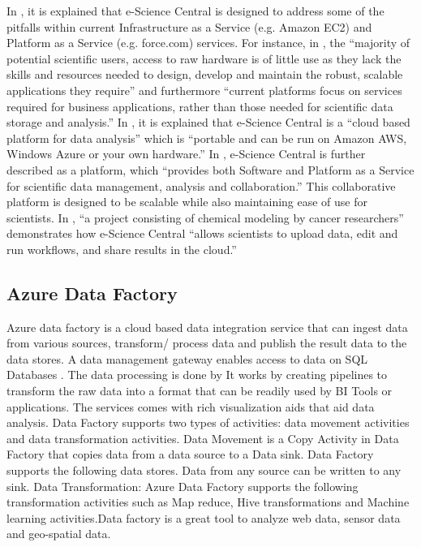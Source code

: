     In \cite{e-science-central-paper-2010}, it is explained that
    e-Science Central is designed to address some of the pitfalls
    within current Infrastructure as a Service (e.g.  Amazon EC2) and
    Platform as a Service (e.g. force.com) services. For instance, in
    \cite{e-science-central-paper-2010}, the ``majority of potential
    scientific users, access to raw hardware is of little use as they
    lack the skills and resources needed to design, develop and
    maintain the robust, scalable applications they require'' and
    furthermore ``current platforms focus on services required for
    business applications, rather than those needed for scientific
    data storage and analysis.'' In \cite{www-e-science-central}, it
    is explained that e-Science Central is a ``cloud based platform for
    data analysis'' which is ``portable and can be run on Amazon AWS,
    Windows Azure or your own hardware.'' In
    \cite{e-science-central-paper-2010}, e-Science Central is further
    described as a platform, which ``provides both Software and
    Platform as a Service for scientific data management, analysis and
    collaboration.'' This collaborative platform is designed to be
    scalable while also maintaining ease of use for scientists. In
    \cite{e-science-central-paper-2010}, ``a project consisting of
    chemical modeling by cancer researchers'' demonstrates how
    e-Science Central ``allows scientists to upload data, edit and run
    workflows, and share results in the cloud.''

\subsection{Azure Data Factory}
    
    Azure data factory is a cloud based data integration service that
    can ingest data from various sources, transform/ process data and
    publish the result data to the data stores. A data management
    gateway enables access to data on SQL Databases
    \cite{www-jamesserra}. The data processing is done by It works by
    creating pipelines to transform the raw data into a format that
    can be readily used by BI Tools or applications. The services
    comes with rich visualization aids that aid data analysis. Data
    Factory supports two types of activities: data movement activities
    and data transformation activities. Data Movement
    \cite{www-microsoft-azure} is a Copy Activity in Data Factory
    that copies data from a data source to a Data sink. Data Factory
    supports the following data stores. Data from any source can be
    written to any sink.  Data Transformation: Azure Data Factory
    supports the following transformation activities such as Map
    reduce, Hive transformations and Machine learning activities.Data
    factory is a great tool to analyze web data, sensor data and
    geo-spatial data.

